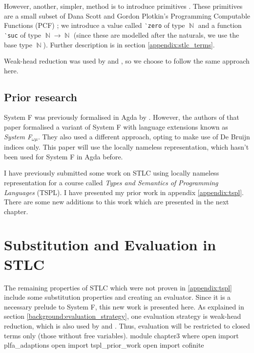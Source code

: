 \documentclass[logo,bsc,singlespacing,parskip,online]{infthesis}
\DeclareMathOperator{\nat}{\mathbb{N}}
\renewenvironment{code}{\mintedcopy[breaklines,breaksymbolleft=\;]{agda}}{\endmintedcopy}
\begin{document}
However, another, simpler, method is to introduce primitives \citep{wadler_programming_2022}. These
primitives are a small subset of Dana Scott and Gordon Plotkin's Programming Computable Functions
(PCF) \citep{plotkin_lcf_1977}; we introduce a value called \texttt{‵zero} of type $\nat$ and a
function \texttt{‵suc} of type $\nat \to \nat$ (since these are modelled after the naturals, we use
the base type $\nat$). Further description is in section \ref{appendix:stlc_terms}.

Weak-head reduction was used by \citet{chargueraud_locally_2012} and
\citet[chapter~Lambda]{wadler_programming_2022}, so we choose to follow the same approach here.

\section{Prior research}
System F was previously formalised in Agda by \citet{hutton_system_2019}. However, the authors of
that paper formalised a variant of System F with language extensions known as \textit{System
F$_{\omega \mu}$}. They also used a different approach, opting to make use of De Bruijn indices
only. This paper will use the locally nameless representation, which hasn't been used for System F
in Agda before.

I have previously submitted some work on STLC using locally nameless representation for a course
called \textit{Types and Semantics of Programming Languages} (TSPL). I have presented my prior work
in appendix \ref{appendix:tspl}. There are some new additions to this work which are presented in
the next chapter.

\chapter{Substitution and Evaluation in STLC}
\label{chapter3:stlc_sub_and_eval}
The remaining properties of STLC which were not proven in \ref{appendix:tspl} include some
substitution properties and creating an evaluator. Since it is a necessary prelude to System F, this
new work is presented here. As explained in section \ref{background:evaluation_strategy}, one
evaluation strategy is weak-head reduction, which is also used by
\citet[chapter~Properties]{wadler_programming_2022} and \citet[section~5]{chargueraud_locally_2012}.
Thus, evaluation will be restricted to closed terms only (those without free variables).
\begin{code}
module chapter3 where
  open import plfa_adaptions
  open import tspl_prior_work
  open import cofinite
\end{code}
\end{document}
